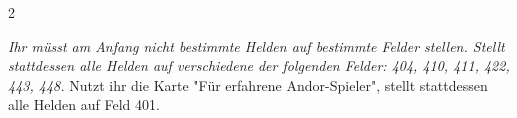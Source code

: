 \documentclass[10pt, a4paper, oneside]{book}
\newcommand{\fan}[1]{\textit{#1}}
\begin{document}
\begin{multicols*}{2}
\begin{bgcolor}
\fan{Ihr müsst am Anfang nicht bestimmte Helden auf bestimmte Felder stellen. Stellt stattdessen alle Helden auf verschiedene der folgenden Felder: 404, 410, 411, 422, 443, 448.} Nutzt ihr die Karte "Für erfahrene Andor-Spieler", stellt stattdessen alle Helden auf Feld 401.
\supercite{dfl1-erfahren}






\end{bgcolor}









\end{multicols*}

\end{document}
